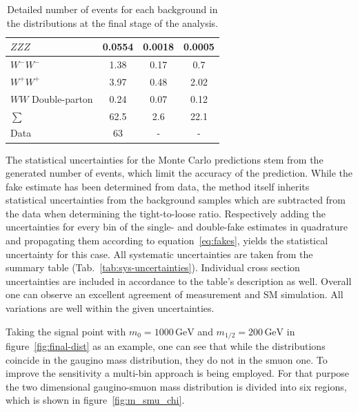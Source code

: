 \begin{table}[!htb]
\begin{tabular}{|l|c|c|c|}
    $ZZZ$                           & 0.0554                               & 0.0018 & 0.0005                     \\ \hline
    $W^- W^-$                       & 1.38                                 & 0.17   & 0.7                        \\
    $W^+ W^+$                       & 3.97                                 & 0.48   & 2.02                       \\
    $WW$ Double-parton              & 0.24                                 & 0.07   & 0.12                       \\ \hline
    $\sum$                          & 62.5                                 & 2.6    & 22.1                       \\ \hline
    Data                            & 63                                   & -      & -                          \\ \hline
  \end{tabular}
  \caption{Detailed number of events for each background in the distributions at the final stage of the analysis.}
  \label{tab:nev-msmuon}
\end{table}

The statistical uncertainties for the Monte Carlo predictions stem from the generated number of events, which limit the accuracy of the prediction. While the fake estimate has been determined from data, the method itself inherits  statistical uncertainties from the background samples which are subtracted from the data when determining the tight-to-loose ratio. Respectively adding the uncertainties for every bin of the single- and double-fake estimates in quadrature and propagating them according to equation~\eqref{eq:fakes}, yields the statistical uncertainty for this case. All systematic uncertainties are taken from the summary table (Tab.~\ref{tab:sys-uncertainties}). Individual cross section uncertainties are included in accordance to the table's description as well. Overall one can observe an excellent agreement of measurement and SM simulation. All variations are well within the given uncertainties.

Taking the signal point with $m_0 = 1000\,\text{GeV}$ and $m_{1/2} = 200\,\text{GeV}$ in figure~\ref{fig:final-dist} as an example, one can see that while the distributions coincide in the gaugino mass distribution, they do not in the smuon one. To improve the sensitivity a multi-bin approach is being employed. For that purpose the two dimensional gaugino-smuon mass distribution is divided into six regions, which is shown in figure~\ref{fig:m_smu_chi}.

